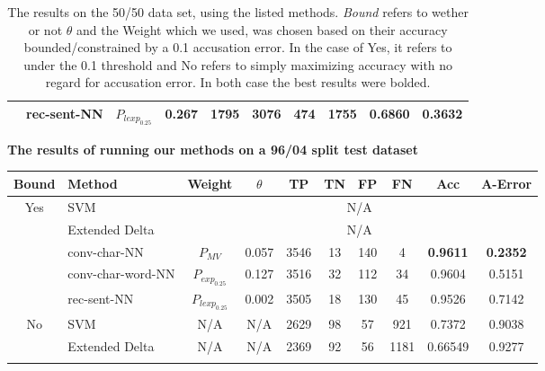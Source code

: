 \begin{table}[]
\begin{tabular}{|c|l|c|c|c|c|c|c|c|c|}
                     & \gls{rec-sent-NN}       & $P_{lexp_{0.25}}$ & 0.267    & 1795 & 3076 & 474  & 1755 & 0.6860          & 0.3632          \\ \hline
\end{tabular}
\caption{The results on the 50/50 data set, using the listed methods.
\textit{Bound} refers to wether or not $\theta$ and the Weight which we used,
was chosen based on their accuracy bounded/constrained by a 0.1 accusation error.
In the case of Yes, it refers to under the 0.1 threshold and No refers to simply
maximizing accuracy with no regard for accusation error. In both case
the best results were bolded.}
\label{tab:50_results}
\end{table}

\begin{table}[]
\centering
\textbf{The results of running our methods on a 96/04 split test dataset}\par\medskip
\begin{tabular}{|c|l|c|c|c|c|c|c|c|c|}
\hline
Bound                & Method                  & Weight            & $\theta$ & TP  & TN & FP & FN  & Acc             & A-Error         \\ \hline
\multirow{5}{*}{Yes} & SVM                     & \multicolumn{8}{c|}{N/A}                                                                   \\ \cline{2-10} 
                     & Extended Delta          & \multicolumn{8}{c|}{N/A}                                                                   \\ \cline{2-10} 
                     & \gls{conv-char-NN}      & $P_{MV}$          & 0.057    & 3546 & 13  & 140 & 4    & \textbf{0.9611} & \textbf{0.2352} \\ \cline{2-10} 
                     & \gls{conv-char-word-NN} & $P_{exp_{0.25}}$  & 0.127    & 3516 & 32  & 112 & 34   & 0.9604          & 0.5151          \\ \cline{2-10} 
                     & \gls{rec-sent-NN}       & $P_{lexp_{0.25}}$ & 0.002    & 3505 & 18  & 130 & 45   & 0.9526          & 0.7142          \\ \hline\hline
\multirow{5}{*}{No}  & SVM                     & N/A               & N/A      & 2629 & 98  & 57  & 921  & 0.7372          & 0.9038          \\ \cline{2-10} 
                     & Extended Delta          & N/A               & N/A      & 2369 & 92  & 56  & 1181 & 0.66549         & 0.9277          \\ \cline{2-10} 

\end{tabular}
\end{table}
